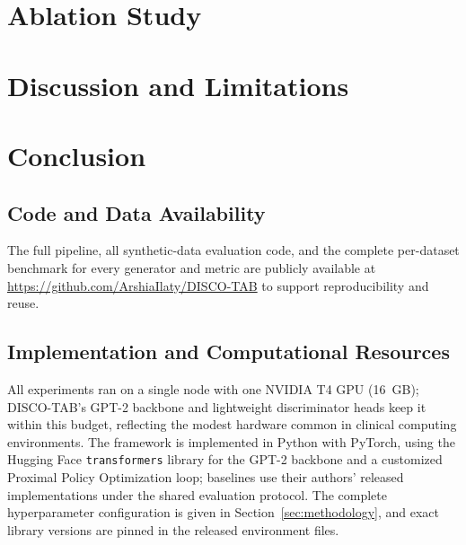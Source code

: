 \documentclass[journal,twoside,web]{ieeecolor}
\begin{document}
\section{Ablation Study}\label{sec:ablation}


\section{Discussion and Limitations}\label{sec:discussion}


\section{Conclusion}\label{sec:conclusion}





\appendix
\subsection{Code and Data Availability}
\label{sec:code}
The full pipeline, all synthetic-data evaluation code, and the complete per-dataset benchmark for every generator and metric are publicly available at \url{https://github.com/ArshiaIlaty/DISCO-TAB} to support reproducibility and reuse.

\subsection{Implementation and Computational Resources}
\label{sec:implementation}
All experiments ran on a single node with one NVIDIA T4 GPU (16~GB); DISCO-TAB's GPT-2 backbone and lightweight discriminator heads keep it within this budget, reflecting the modest hardware common in clinical computing environments. The framework is implemented in Python with PyTorch, using the Hugging Face \texttt{transformers} library for the GPT-2 backbone and a customized Proximal Policy Optimization loop; baselines use their authors' released implementations under the shared evaluation protocol. The complete hyperparameter configuration is given in Section~\ref{sec:methodology}, and exact library versions are pinned in the released environment files.

% 
\end{document}
